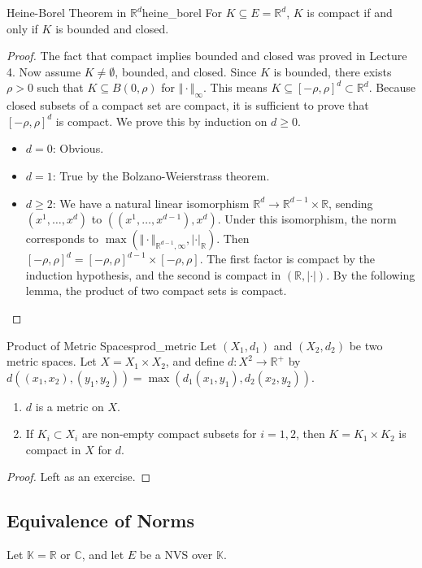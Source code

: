 \documentclass[11pt, a4paper]{article}
\newcommand{\R}{\mathbb{R}}
\newcommand{\C}{\mathbb{C}}
\begin{document}
\begin{proposition}{Heine-Borel Theorem in $\R^d$}{heine_borel}
For $K \subseteq E = \R^d$, $K$ is compact if and only if $K$ is bounded and closed.
\end{proposition}
\begin{proof}
The fact that compact implies bounded and closed was proved in Lecture 4.
Now assume $K \neq \emptyset$, bounded, and closed.
Since $K$ is bounded, there exists $\rho > 0$ such that $K \subseteq B(0, \rho)$ for $\Vert \cdot \Vert_\infty$.
This means $K \subseteq [-\rho, \rho]^d \subset \R^d$.
Because closed subsets of a compact set are compact, it is sufficient to prove that $[-\rho, \rho]^d$ is compact.
We prove this by induction on $d \ge 0$.
\begin{itemize}
    \item $d = 0$: Obvious.
    \item $d = 1$: True by the Bolzano-Weierstrass theorem.
    \item $d \ge 2$: We have a natural linear isomorphism $\R^d \to \R^{d-1} \times \R$, sending $(x^1, \dots, x^d)$ to $((x^1, \dots, x^{d-1}), x^d)$.
    Under this isomorphism, the norm corresponds to $\max(\Vert \cdot \Vert_{\R^{d-1}, \infty}, |\cdot|_{\R})$.
    Then $[-\rho, \rho]^d = [-\rho, \rho]^{d-1} \times [-\rho, \rho]$.
    The first factor is compact by the induction hypothesis, and the second is compact in $(\R, |\cdot|)$.
    By the following lemma, the product of two compact sets is compact.
\end{itemize}
\end{proof}

\begin{lemma}{Product of Metric Spaces}{prod_metric}
Let $(X_1, d_1)$ and $(X_2, d_2)$ be two metric spaces.
Let $X = X_1 \times X_2$, and define $d: X^2 \to \R^+$ by $d((x_1, x_2), (y_1, y_2)) = \max(d_1(x_1, y_1), d_2(x_2, y_2))$.
\begin{enumerate}
    \item $d$ is a metric on $X$.
    \item If $K_i \subset X_i$ are non-empty compact subsets for $i=1,2$, then $K = K_1 \times K_2$ is compact in $X$ for $d$.
\end{enumerate}
\end{lemma}
\begin{proof}
Left as an exercise.
\end{proof}

\subsection{Equivalence of Norms}
Let $\mathbb{K} = \R$ or $\C$, and let $E$ be a NVS over $\mathbb{K}$.
\end{document}
